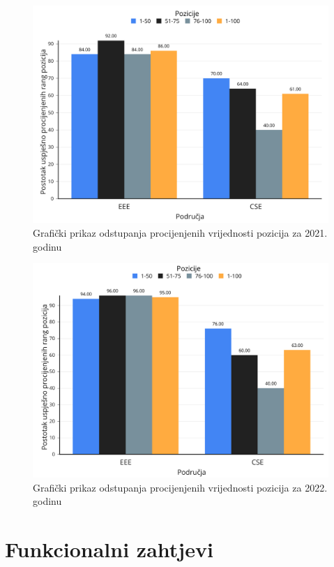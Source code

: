 \documentclass[times, utf8, zavrsni]{fer}
\begin{document}
\begin{figure}[htb]
    \centering
    \includegraphics[scale=0.25]{pozicije2021.png}
    \caption{Grafički prikaz odstupanja procijenjenih vrijednosti pozicija za 2021. godinu}
    \label{fig:pozicije2021}
    \end{figure} 
    \begin{figure}[htb]
        \centering
        \includegraphics[scale=0.25]{pozicije2022.png}
        \caption{Grafički prikaz odstupanja procijenjenih vrijednosti pozicija za 2022. godinu}
        \label{fig:pozicije2022}
        \end{figure}   


\chapter{Funkcionalni zahtjevi}
\end{document}
